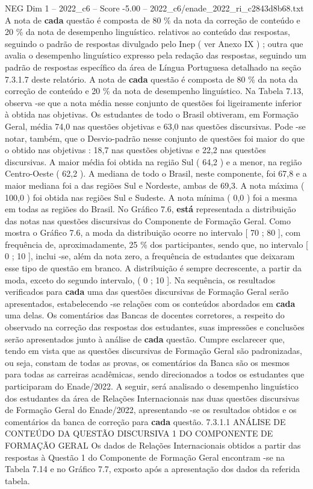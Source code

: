 \begin{textsample}{NEG Dim 1 – 2022\_c6 – Score -5.00 – 2022\_c6/enade\_2022\_ri\_c2843d8b68.txt}
A nota de \textbf{cada} questão é composta de 80 \% da nota da correção de conteúdo e 20 \% da nota de desempenho linguístico. relativos ao conteúdo das respostas, seguindo o padrão de respostas divulgado pelo Inep ( ver Anexo IX ) ; outra que avalia o desempenho linguístico expresso pela redação das respostas, seguindo um padrão de respostas específico da área de Língua Portuguesa detalhado na seção 7.3.1.7 deste relatório.
A nota de \textbf{cada} questão é composta de 80 \% da nota da correção de conteúdo e 20 \% da nota de desempenho linguístico.
Na Tabela 7.13, observa -se que a nota média nesse conjunto de questões foi ligeiramente inferior à obtida nas objetivas.
Os estudantes de todo o Brasil obtiveram, em Formação Geral, média 74,0 nas questões objetivas e 63,0 nas questões discursivas.
Pode -se notar, também, que o Desvio-padrão nesse conjunto de questões foi maior do que o obtido nas objetivas : 18,7 nas questões objetivas e 22,2 nas questões discursivas.
A maior média foi obtida na região Sul ( 64,2 ) e a menor, na região Centro-Oeste ( 62,2 ).
A mediana de todo o Brasil, neste componente, foi 67,8 e a maior mediana foi a das regiões Sul e Nordeste, ambas de 69,3.
A nota máxima ( 100,0 ) foi obtida nas regiões Sul e Sudeste.
A nota mínima ( 0,0 ) foi a mesma em todas as regiões do Brasil.
No Gráfico 7.6, \textbf{está} representada a distribuição das notas nas questões discursivas do Componente de Formação Geral.
Como mostra o Gráfico 7.6, a moda da distribuição ocorre no intervalo [ 70 ; 80 ], com frequência de, aproximadamente, 25 \% dos participantes, sendo que, no intervalo [ 0 ; 10 ], inclui -se, além da nota zero, a frequência de estudantes que deixaram esse tipo de questão em branco.
A distribuição é sempre decrescente, a partir da moda, exceto do segundo intervalo, ( 0 ; 10 ].
Na sequência, os resultados verificados para \textbf{cada} uma das questões discursivas de Formação Geral serão apresentados, estabelecendo -se relações com os conteúdos abordados em \textbf{cada} uma delas.
Os comentários das Bancas de docentes corretores, a respeito do observado na correção das respostas dos estudantes, suas impressões e conclusões serão apresentados junto à análise de \textbf{cada} questão.
Cumpre esclarecer que, tendo em vista que as questões discursivas de Formação Geral são padronizadas, ou seja, constam de todas as provas, os comentários da Banca são os mesmos para todas as carreiras acadêmicas, sendo direcionados a todos os estudantes que participaram do Enade/2022.
A seguir, será analisado o desempenho linguístico dos estudantes da área de Relações Internacionais nas duas questões discursivas de Formação Geral do Enade/2022, apresentando -se os resultados obtidos e os comentários da banca de correção para \textbf{cada} questão. 7.3.1.1 ANÁLISE DE CONTEÚDO DA QUESTÃO DISCURSIVA 1 DO COMPONENTE DE FORMAÇÃO GERAL Os dados de Relações Internacionais obtidos a partir das respostas à Questão 1 do Componente de Formação Geral encontram -se na Tabela 7.14 e no Gráfico 7.7, exposto após a apresentação dos dados da referida tabela.

\end{textsample}
